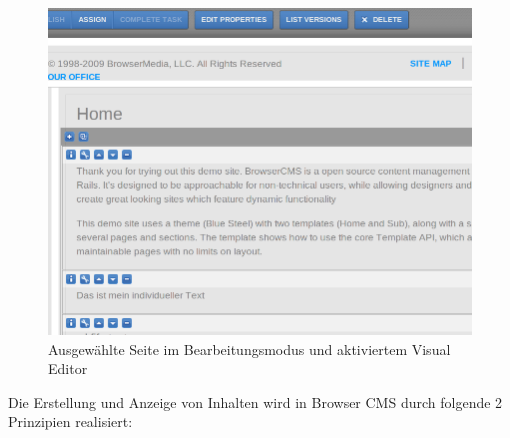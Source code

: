 \begin{figure}[!h]
\begin{center}
\includegraphics[scale=0.5]{images/analyse/browser/frontendangemeldet.png}
\caption{Ausgewählte Seite im Bearbeitungsmodus und aktiviertem Visual Editor}
\label{browserpageedit}
\end{center}
\end{figure}
Die Erstellung und Anzeige von Inhalten wird in Browser CMS durch folgende 2 Prinzipien realisiert:
